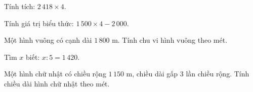 \begin{ex} %
Tính tích: $2\,418 \times 4$.
\end{ex}

\begin{ex} %
Tính giá trị biểu thức: $1\,500 \times 4 - 2\,000$.
\end{ex}

\begin{ex} %
Một hình vuông có cạnh dài $1\,800\text{ m}$. Tính chu vi hình vuông theo mét.
\end{ex}

\begin{ex} %
Tìm $x$ biết: $x : 5 = 1\,420$.
\end{ex}

\begin{ex} %
Một hình chữ nhật có chiều rộng $1\,150\text{ m}$, chiều dài gấp 3 lần chiều rộng. Tính chiều dài hình chữ nhật theo mét.
\end{ex}
